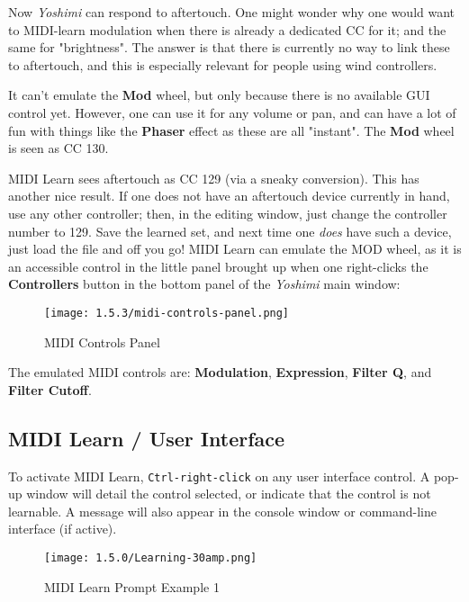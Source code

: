    Now \textsl{Yoshimi} can respond to aftertouch.
   One might wonder why one would want to MIDI-learn modulation when there is
   already a dedicated CC for it; and the same for "brightness". The answer is
   that there is currently no way to link these to aftertouch, and this is
   especially relevant for people using wind controllers.

   It can't emulate the \textbf{Mod} wheel, but only because there is no
   available GUI control yet.  However, one can use it for any volume or pan, and
   can have a lot of fun with things like the \textbf{Phaser} effect as these are
   all "instant".
   The \textbf{Mod} wheel is seen as CC 130.

   MIDI Learn sees aftertouch as CC 129 (via a sneaky conversion).
   This has another nice result.
   If one does not have an aftertouch device currently
   in hand, use any other controller; then, in the editing window, just change the
   controller number to 129. Save the learned set, and next time one
   \textsl{does} have such a device, just load the file and off you go!
   MIDI Learn can emulate the MOD wheel, as it is an accessible control in the
   little panel brought up when one right-clicks the \textbf{Controllers}
   button in the bottom panel of the \textsl{Yoshimi} main window:

\begin{figure}[H]
   \centering 
   \texttt{[image: 1.5.3/midi-controls-panel.png]}
   \caption{MIDI Controls Panel}
   \label{fig:midi_controls_panel}
\end{figure}

   The emulated  MIDI controls are:
    \textbf{Modulation},
    \textbf{Expression},
    \textbf{Filter Q}, and
    \textbf{Filter Cutoff}.

\subsection{MIDI Learn / User Interface}
\label{subsec:midi_learn_user_interface}

   To activate MIDI Learn, \texttt{Ctrl-right-click}
   on any user interface control.
   A pop-up window will detail the control selected, or indicate that the
   control is not learnable.
   A message will also appear in the console window or command-line interface
   (if active).

\begin{figure}[H]
   \centering 
   \texttt{[image: 1.5.0/Learning-30amp.png]}
   \caption{MIDI Learn Prompt Example 1}
   \label{fig:midi_learn_ex_1}
\end{figure}

